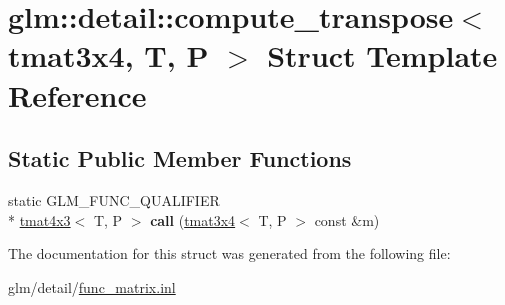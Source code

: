 \hypertarget{structglm_1_1detail_1_1compute__transpose_3_01tmat3x4_00_01T_00_01P_01_4}{\section{glm\-:\-:detail\-:\-:compute\-\_\-transpose$<$ tmat3x4, T, P $>$ Struct Template Reference}
\label{structglm_1_1detail_1_1compute__transpose_3_01tmat3x4_00_01T_00_01P_01_4}
}
\subsection*{Static Public Member Functions}
\begin{DoxyCompactItemize}
\item 
\hypertarget{structglm_1_1detail_1_1compute__transpose_3_01tmat3x4_00_01T_00_01P_01_4_a62f5b6aa47fa96ba744c118e937525c0}{static G\-L\-M\-\_\-\-F\-U\-N\-C\-\_\-\-Q\-U\-A\-L\-I\-F\-I\-E\-R \\*
\hyperlink{structglm_1_1tmat4x3}{tmat4x3}$<$ T, P $>$ {\bfseries call} (\hyperlink{structglm_1_1tmat3x4}{tmat3x4}$<$ T, P $>$ const \&m)}\label{structglm_1_1detail_1_1compute__transpose_3_01tmat3x4_00_01T_00_01P_01_4_a62f5b6aa47fa96ba744c118e937525c0}

\end{DoxyCompactItemize}


The documentation for this struct was generated from the following file\-:\begin{DoxyCompactItemize}
\item 
glm/detail/\hyperlink{func__matrix_8inl}{func\-\_\-matrix.\-inl}\end{DoxyCompactItemize}

